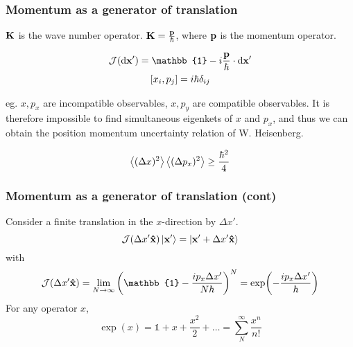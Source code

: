 \begin{frame}
	\frametitle{Momentum as a generator of translation}
	$\vb K$ is the wave number operator. $\vb K = \frac{\vb p}{\hbar}$, where $\vb p$ is the momentum operator.

	\begin{gather*}
		\mathcal{J}(\dd \vb x') = \mathbb{1} - i \frac{\vb p}{\hbar} \cdot \dd{\vb x'}\\
		\comm{x_i}{p_j} = i \hbar \delta_{ij}
	\end{gather*}

	eg. $x,p_x$ are incompatible observables, $x,p_y$ are compatible observables.
	It is therefore impossible to find simultaneous eigenkets of $x$ and $p_x$, and thus we can obtain the position
	momentum uncertainty relation of W. Heisenberg.

	$$
		\ev{(\Delta x)^2} \ev{(\Delta p_x)^2} \ge \frac{\hbar^2}{4}
	$$
\end{frame}


\begin{frame}
	\frametitle{Momentum as a generator of translation (cont)}
	Consider a finite translation in the $x$-direction by $\Delta x'$.
	\[ \mathcal{J}(\Delta x' \vu x)	\ket{\vb x'} = \ket{\vb x' + \Delta x' \vu x} \]
	with
	$$
		\mathcal{J}(\Delta x' \vu x) = \lim_{N \to \infty} \qty(\mathbb{1} - \frac{i p_x \Delta x'}{N \hbar})^N
		= \exp(-\frac{i p_x \Delta x'}{\hbar})
	$$
	For any operator $x$,
	\[\exp(x) = \mathbb{1} + x + \frac{x^2}{2} + \dots = \sum_{N}^{\infty} \frac{x^n}{n!}\]

\end{frame}


